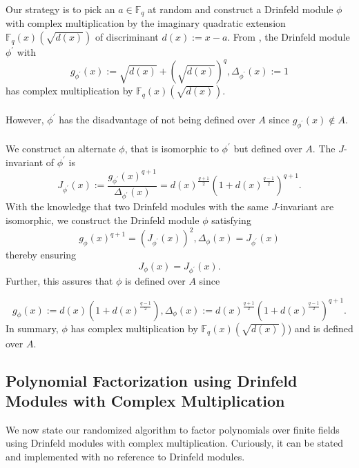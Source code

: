 \documentclass[12pt]{article}
\theoremstyle{plain}
\theoremstyle{definition}
\def\F{\ensuremath{\mathbb{F}}}
\newcommand{\D}{\Delta}
\begin{document}
Our strategy is to pick an $a \in \F_q$ at random and construct a Drinfeld module $\phi$ with complex multiplication by the imaginary quadratic extension $\F_q(x)(\sqrt{d(x)})$ of discriminant $d(x):=x-a$. From \cite{dor}, the Drinfeld module $\phi^\prime$ with $$g_{\phi^\prime}(x):=\sqrt{d(x)}+\left(\sqrt{d(x)}\right)^q, \D_{\phi^\prime}(x) := 1$$ has complex multiplication by $\F_q(x)(\sqrt{d(x)})$.\\ \\
However, $\phi^\prime$ has the disadvantage of not being defined over $A$ since $g_{\phi^\prime}(x) \notin A$.\\ \\
We construct an alternate $\phi$, that is isomorphic to $\phi^\prime$ but defined over $A$. The $J$-invariant \cite{gek} of $\phi^\prime$ is $$J_{\phi^\prime}(x) := \frac{g_{\phi^\prime}(x)^{q+1}}{\D_{\phi^\prime}(x)} = d(x)^{\frac{q+1}{2}}\left(1+d(x)^{\frac{q-1}{2}}\right)^{q+1}.$$
With the knowledge that two Drinfeld modules with the same $J$-invariant are isomorphic, we construct the Drinfeld module $\phi$ satisfying $$g_\phi(x)^{q+1} = (J_{\phi^\prime}(x))^2, \D_{\phi}(x)= J_{\phi^\prime}(x)$$ thereby ensuring $$J_{\phi}(x)=J_{\phi^\prime}(x).$$ Further, this assures that $\phi$ is defined over $A$ since

$$g_\phi(x):=d(x)(1+d(x)^{\frac{q-1}{2}}),\D_\phi(x):=d(x)^{\frac{q+1}{2}}(1+d(x)^{\frac{q-1}{2}})^{q+1}.$$
In summary, $\phi$ has complex multiplication by $\F_q(x)(\sqrt{d(x)})$) and is defined over $A$.
\subsection{Polynomial Factorization using Drinfeld Modules with Complex Multiplication}
We now state our randomized algorithm to factor polynomials over finite fields using Drinfeld modules with complex multiplication. Curiously, it can be stated and implemented with no reference to Drinfeld modules.
\end{document}
